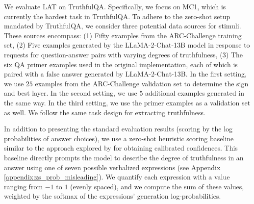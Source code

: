 We evaluate LAT on TruthfulQA. Specifically, we focus on MC1, which is currently the hardest task in TruthfulQA. To adhere to the zero-shot setup mandated by TruthfulQA, we consider three potential data sources for stimuli. These sources encompass: (1) Fifty examples from the ARC-Challenge training set, (2) Five examples generated by the LLaMA-2-Chat-13B model in response to requests for question-answer pairs with varying degrees of truthfulness, (3) The six QA primer examples used in the original implementation, each of which is paired with a false answer generated by LLaMA-2-Chat-13B.
In the first setting, we use $25$ examples from the ARC-Challenge validation set to determine the sign and best layer. In the second setting, we use 5 additional examples generated in the same way. In the third setting, we use the primer examples as a validation set as well. We follow the same task design for extracting truthfulness.

In addition to presenting the standard evaluation results (scoring by the log probabilities of answer choices), we use a zero-shot heuristic scoring baseline similar to the approach explored by \citet{tian2023just} for obtaining calibrated confidences. This baseline directly prompts the model to describe the degree of truthfulness in an answer using one of seven possible verbalized expressions (see Appendix \ref{appendix:zs_prob_misleading}). We quantify each expression with a value ranging from $-1$ to $1$ (evenly spaced), and we compute the sum of these values, weighted by the softmax of the expressions' generation log-probabilities.







